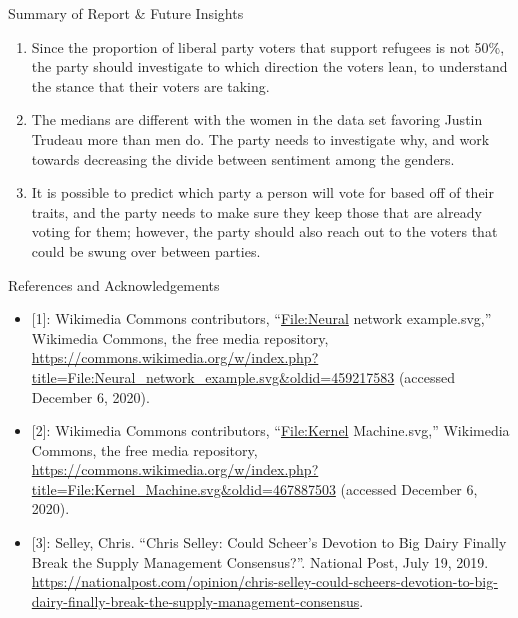 \documentclass[
  ignorenonframetext,
]{beamer}
\begin{document}
\begin{frame}{Summary of Report \& Future Insights}
\protect\hypertarget{summary-of-report-future-insights}{}

\begin{enumerate}
\item
  Since the proportion of liberal party voters that support refugees is
  not 50\%, the party should investigate to which direction the voters
  lean, to understand the stance that their voters are taking.
\item
  The medians are different with the women in the data set favoring
  Justin Trudeau more than men do. The party needs to investigate why,
  and work towards decreasing the divide between sentiment among the
  genders.
\item
  It is possible to predict which party a person will vote for based off
  of their traits, and the party needs to make sure they keep those that
  are already voting for them; however, the party should also reach out
  to the voters that could be swung over between parties.
\end{enumerate}

\end{frame}

\begin{frame}{References and Acknowledgements}
\protect\hypertarget{references-and-acknowledgements}{}

\fontsize{8}{10}\selectfont

\begin{itemize}
\item
  {[}1{]}: Wikimedia Commons contributors, ``\url{File:Neural} network
  example.svg,'' Wikimedia Commons, the free media repository,
  \url{https://commons.wikimedia.org/w/index.php?title=File:Neural_network_example.svg\&oldid=459217583}
  (accessed December 6, 2020).
\item
  {[}2{]}: Wikimedia Commons contributors, ``\url{File:Kernel}
  Machine.svg,'' Wikimedia Commons, the free media repository,
  \url{https://commons.wikimedia.org/w/index.php?title=File:Kernel_Machine.svg\&oldid=467887503}
  (accessed December 6, 2020).
\item
  {[}3{]}: Selley, Chris. ``Chris Selley: Could Scheer's Devotion to Big
  Dairy Finally Break the Supply Management Consensus?''. National Post,
  July 19, 2019.
  \url{https://nationalpost.com/opinion/chris-selley-could-scheers-devotion-to-big-dairy-finally-break-the-supply-management-consensus}.
\end{itemize}

\end{frame}
\end{document}
